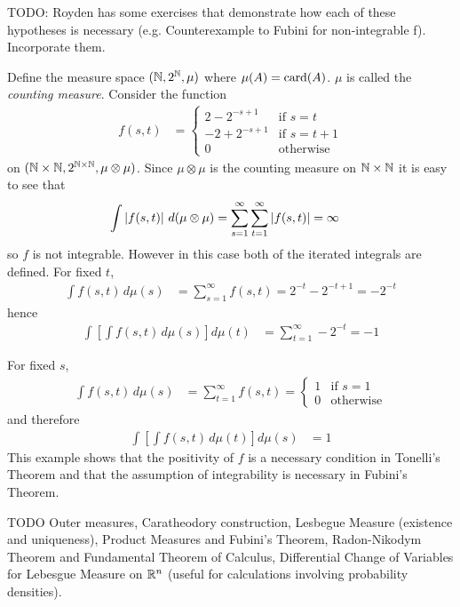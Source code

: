 TODO: Royden has some exercises that demonstrate how each of these
hypotheses is necessary (e.g. Counterexample to Fubini for
non-integrable f).  Incorporate them.
\begin{examp}Define the measure space $(\mathbb{N}, 2^{\mathbb{N}},
  \mu)$ where $\mu(A) = \operatorname*{card}(A)$.  $\mu$ is called the \emph{counting
    measure}.  
Consider the function 
\begin{align*}
f(s,t) &= \begin{cases}
2 - 2^{-s+1} & \text{if $s=t$}\\
-2 + 2^{-s+1} & \text{if $s = t + 1$} \\
0 & \text{otherwise}
\end{cases}
\end{align*}
on $(\mathbb{N} \times \mathbb{N}, 2^{\mathbb{N} \times \mathbb{N}}, \mu
\otimes \mu)$.  Since $\mu \otimes \mu$ is the counting measure on
$\mathbb{N} \times \mathbb{N}$ it is easy to see that 
\begin{align*}
\int \left \vert f(s,t) \right \vert \, d ( \mu \otimes \mu) &= \sum_{s=1}^\infty
\sum_{t=1}^\infty \left \vert f(s,t) \right \vert = \infty
\end{align*}
so $f$ is not integrable.  However in this case both of the iterated
integrals are defined.
For fixed $t$, 
\begin{align*}
\int f(s,t) \, d\mu(s) &=
\sum_{s=1}^\infty f(s,t) = 2^{-t} - 2^{-t+1} = -2^{-t}
\end{align*}
hence 
\begin{align*}
\int \left [ \int f(s,t) \, d\mu(s) \right ] d \mu(t) &=
\sum_{t=1}^\infty -2^{-t} = -1
\end{align*}

For fixed $s$, 
\begin{align*}
\int f(s,t) \, d\mu(s) &=
\sum_{t=1}^\infty f(s,t) = \begin{cases}
1 & \text {if $s=1$}\\
0 & \text {otherwise}
\end{cases}
\end{align*}
and therefore 
\begin{align*}
\int \left [ \int f(s,t) \, d\mu(t) \right ] d \mu(s) &= 1
\end{align*}
This example shows that the positivity of $f$ is a necessary condition
in Tonelli's Theorem and that the assumption of integrability is
necessary in Fubini's Theorem.
\end{examp}


TODO
Outer measures, Caratheodory construction, Lesbegue Measure (existence
and uniqueness), Product Measures and Fubini's Theorem, Radon-Nikodym Theorem and
Fundamental Theorem of Calculus, Differential Change of Variables for
Lebesgue Measure on $\mathbb{R}^n$ (useful for calculations involving
probability densities).

